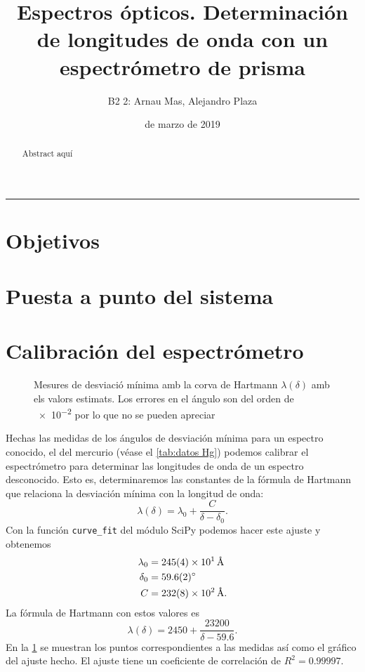 \documentclass[12pt]{article}
\title{\sffamily {\bfseries Práctica 4:} Espectros ópticos. Determinación de longitudes de onda con un espectrómetro de prisma}
\author{\sffamily B2 2: Arnau Mas, Alejandro Plaza}
\date{\sffamily 14 de marzo de 2019}
\numberwithin{table}{section}
\numberwithin{figure}{section}
\numberwithin{equation}{section}
\newcommand{\data}[3]{\SI{#1 \pm #2}{#3}}
\begin{document}
\maketitle
\renewcommand{\abstractname}{\sffamily \bfseries Resumen:}
\begin{abstract}
Abstract aquí
\end{abstract}
\hrule

\section{Objetivos}

\section{Puesta a punto del sistema}
\section{Calibración del espectrómetro}
\begin{figure}[htb]
	\small \centering \sffamily
	
	\caption{Mesures de desviació mínima amb la corva de Hartmann \( \lambda(\delta) \) amb els valors estimats. Los errores en el ángulo son del orden de \num{e-2} por lo que no se pueden apreciar}
	\label{fig:hartmann Hg}
\end{figure}

Hechas las medidas de los ángulos de desviación mínima para un espectro conocido, el del mercurio (véase el \cref{tab:datos Hg}) podemos calibrar el espectrómetro para determinar las longitudes de onda de un espectro desconocido. Esto es, determinaremos las constantes de la fórmula de Hartmann que relaciona la desviación mínima con la longitud de onda:
\begin{equation} \label{eqn:hartmann}
	\lambda(\delta) = \lambda_0 + \frac{C}{\delta - \delta_0}.
\end{equation}
Con la función \texttt{curve\_fit} del módulo \textsf{SciPy} podemos hacer este ajuste y obtenemos
\begin{equation} \label{eqn:parametros hartmann}
	\begin{aligned}
		\lambda_0 & = \data{245}{4e1}{\angstrom} \\
		\delta_0 & = \data{59.6}{0.2}{\degree} \\
		C & = \data{232}{8e2}{\angstrom}.
	\end{aligned}
\end{equation}
La fórmula de Hartmann con estos valores es 
\begin{equation} \label{eqn:hartmann con parametros}
	\lambda(\delta) = \num{2450} + \frac{\num{23200}}{\delta - \num{59.6}}.
\end{equation}
En la \cref{fig:hartmann Hg} se muestran los puntos correspondientes a las medidas así como el gráfico del ajuste hecho. El ajuste tiene un coeficiente de correlación de \( R^2 = \num{0.99997} \).
\end{document}
